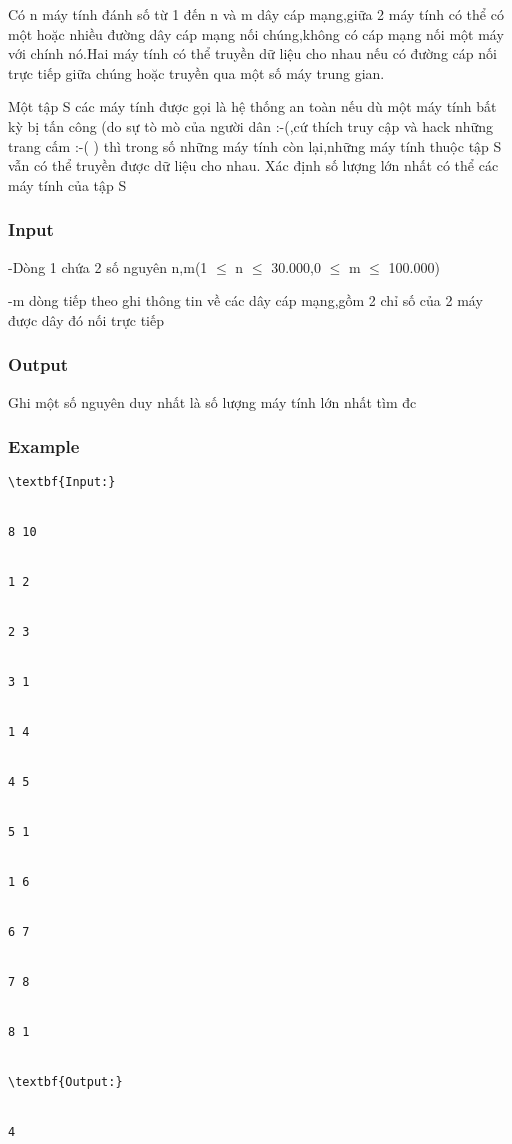 



   Có n máy tính đánh số từ 1 đến n và m dây cáp mạng,giữa 2 máy tính có thể có một hoặc nhiều đường dây cáp mạng nối chúng,không có cáp mạng nối một máy với chính nó.Hai máy tính có thể truyền dữ liệu cho nhau nếu có đường cáp nối trực tiếp giữa chúng hoặc truyền qua một số máy trung gian.  

   Một tập S các máy tính được gọi là hệ thống an toàn nếu dù một máy tính bất kỳ bị tấn công (do sự tò mò của người dân :-(,cứ thích truy cập và hack những trang cấm :-( ) thì trong số những máy tính còn lại,những máy tính thuộc tập S vẫn có thể truyền được dữ liệu cho nhau. Xác định số lượng lớn nhất có thể các máy tính của tập S  

\subsubsection{   Input  }

   -Dòng 1 chứa 2 số nguyên n,m(1 $\le$ n $\le$ 30.000,0 $\le$ m $\le$ 100.000)  

   -m dòng tiếp theo ghi thông tin về các dây cáp mạng,gồm 2 chỉ số của 2 máy được dây đó nối trực tiếp  

\subsubsection{   Output  }

   Ghi một số nguyên duy nhất là số lượng máy tính lớn nhất tìm đc  

\subsubsection{   Example  }
\begin{verbatim}
\textbf{Input:}


8 10


1 2


2 3


3 1


1 4


4 5


5 1


1 6


6 7


7 8


8 1


\textbf{Output:}


4


\end{verbatim}
